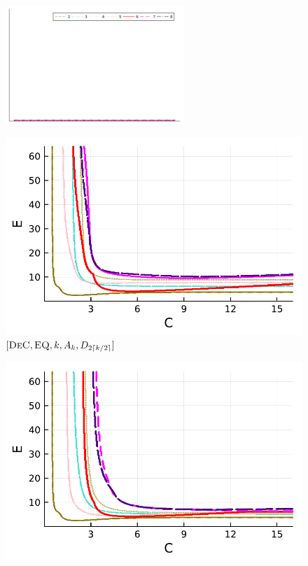 \begin{figure}[!h]
	\centering
	\includegraphics[width=0.6\textwidth,trim={160 340 30 22}, clip]{pdf/pdepics/legends/colors_a-d_new_horiz_2-8_no_order.pdf}\\
	\begin{minipage}[t]{0.32\textwidth}
		\includegraphics[width=\textwidth]{pdf/pdepics/diff/IMEXDeC_equispaced_all_2-8.pdf}
		\centering
		$[\textsc{DeC},\textsc{EQ}, k, A_k,D_{2\lceil k/2 \rceil}]$
	\end{minipage} 
	\begin{minipage}[t]{0.32\textwidth}
		\includegraphics[width=\textwidth]{pdf/pdepics/diff/IMEXDeC_subtimesteps_equispaced_all_2-8.pdf}

\end{minipage}
\end{figure}
